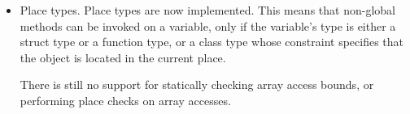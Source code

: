 \begin{itemize}
\item{Place types.} Place types are now implemented. This means that
  non-global methods can be invoked on a variable, only if the
  variable's type is either a struct type or a function type, or a
  class type whose constraint specifies that the object is located in
  the current place.

  There is still no support for statically checking array access
  bounds, or performing place checks on array accesses.

\end{itemize}
